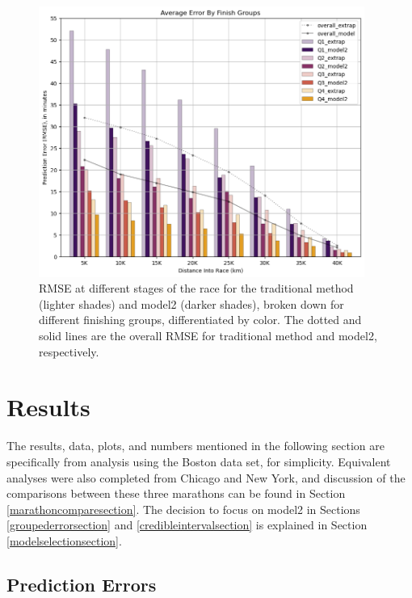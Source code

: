 \documentclass[USenglish,twocolumn]{article}
\theoremstyle{dgthm}
\theoremstyle{dgdef}
\begin{document}
\begin{figure}[ht]
    \centering
    \includegraphics[width=4.2in]{../analysis/plots/bos_rmse_groups.png}
    \caption{RMSE at different stages of the race for the traditional method (lighter shades) and model2 (darker shades), broken down for different finishing groups, differentiated by color. The dotted and solid lines are the overall RMSE for traditional method and model2, respectively.}
     \label{fig:groups}
\end{figure}

\section{Results}
\label{results}


The results, data, plots, and numbers mentioned in the following section are specifically from analysis using the Boston data set, for simplicity. Equivalent analyses were also completed from Chicago and New York, and discussion of the comparisons between these three marathons can be found in Section \ref{marathoncomparesection}. The decision to focus on model2 in Sections \ref{groupederrorsection} and \ref{credibleintervalsection} is explained in Section \ref{modelselectionsection}.

\subsection{Prediction Errors}
\label{predictionerrorsection}
\end{document}
